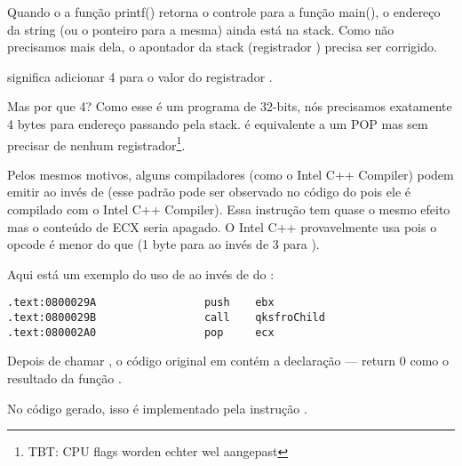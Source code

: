 Quando o a função printf() retorna o controle para a função main(), o endereço da string (ou o ponteiro para a mesma) ainda está na stack.
Como não precisamos mais dela, o apontador da stack (registrador \ESP) precisa ser corrigido.

 significa adicionar 4 para o valor do registrador \ESP.

Mas por que 4? Como esse é um programa de 32-bits, nós precisamos exatamente 4 bytes para endereço passando pela stack.
 é equivalente a um POP mas sem precisar de nenhum registrador\footnote{\ac{TBT}: CPU flags worden echter wel aangepast}.

\myindex{\oracle}

Pelos mesmos motivos, alguns compiladores (como o Intel C++ Compiler) podem emitir  ao invés de \ADD (esse padrão pode ser observado no código do \oracle{} pois ele é compilado com o Intel C++ Compiler).
Essa instrução tem quase o mesmo efeito mas o conteúdo de ECX seria apagado.
O Intel C++ provavelmente usa  pois o opcode é menor do que  (1 byte para \POP ao invés de 3 para \ADD).

Aqui está um exemplo do uso de \POP ao invés de \ADD do \oracle{}:

\begin{lstlisting}[caption=\oracle 10.2 Linux (app.o file),style=customasmx86]
.text:0800029A                 push    ebx
.text:0800029B                 call    qksfroChild
.text:080002A0                 pop     ecx
\end{lstlisting}



Depois de chamar \printf{}, o código original em \CCpp contém a declaração  --- return 0 como o resultado da função \main{}.

No código gerado, isso é implementado pela instrução .


